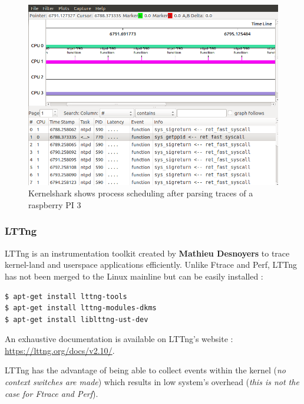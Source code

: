 \begin{itemize}
		\begin{figure}[H]
			\centering
        	\includegraphics[scale=0.40]{img/solution/kernelshark-task-schedule.png}
        	\caption{Kernelshark shows process scheduling after parsing traces of a raspberry PI 3}
        	\label{Kernelshark shows process scheduling after parsing traces of a raspberry PI 3}
    	\end{figure}




\end{itemize}


\subsubsection{LTTng}
LTTng is an instrumentation toolkit created by \textbf{Mathieu Desnoyers} to trace kernel-land and userspace applications efficiently. Unlike Ftrace and Perf, LTTng has not been merged to the Linux mainline but can be easily installed :

		\begin{lstlisting}[style=BashInputStyle]
$ apt-get install lttng-tools
$ apt-get install lttng-modules-dkms
$ apt-get install liblttng-ust-dev
	\end{lstlisting}	
	
An exhaustive documentation is available on LTTng's website : {\color{blue}\url{https://lttng.org/docs/v2.10/}}.

LTTng has the advantage of being able to collect events within the kernel (\emph{no context switches are made}) which results in low system's overhead (\emph{this is not the case for Ftrace and Perf}).

